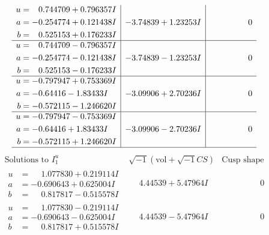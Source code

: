 \documentclass[1p]{elsarticle_modified}
\theoremstyle{definition}
\newcommand{\I}{\sqrt{-1}}
\begin{document}
$$\begin{array}{c|c|c}
\begin{aligned}
u &= \phantom{-}0.744709 + 0.796357 I \\
a &= -0.254774 + 0.121438 I \\
b &= \phantom{-}0.525153 + 0.176233 I\end{aligned}
 & -3.74839 + 1.23253 I & \phantom{-0.000000 } 0 \\ \hline\begin{aligned}
u &= \phantom{-}0.744709 - 0.796357 I \\
a &= -0.254774 - 0.121438 I \\
b &= \phantom{-}0.525153 - 0.176233 I\end{aligned}
 & -3.74839 - 1.23253 I & \phantom{-0.000000 } 0 \\ \hline\begin{aligned}
u &= -0.797947 + 0.753369 I \\
a &= -0.64416 - 1.83433 I \\
b &= -0.572115 - 1.246620 I\end{aligned}
 & -3.09906 + 2.70236 I & \phantom{-0.000000 } 0 \\ \hline\begin{aligned}
u &= -0.797947 - 0.753369 I \\
a &= -0.64416 + 1.83433 I \\
b &= -0.572115 + 1.246620 I\end{aligned}
 & -3.09906 - 2.70236 I & \phantom{-0.000000 } 0\\
 \hline 
 \end{array}$$\newpage$$\begin{array}{c|c|c}  
\text{Solutions to }I^u_{1}& \I (\text{vol} + \sqrt{-1}CS) & \text{Cusp shape}\\
 \hline 
\begin{aligned}
u &= \phantom{-}1.077830 + 0.219114 I \\
a &= -0.690643 + 0.625004 I \\
b &= \phantom{-}0.817817 - 0.515578 I\end{aligned}
 & \phantom{-}4.44539 + 5.47964 I & \phantom{-0.000000 } 0 \\ \hline\begin{aligned}
u &= \phantom{-}1.077830 - 0.219114 I \\
a &= -0.690643 - 0.625004 I \\
b &= \phantom{-}0.817817 + 0.515578 I\end{aligned}
 & \phantom{-}4.44539 - 5.47964 I & \phantom{-0.000000 } 0 \\ \hline\begin{aligned}

\end{aligned}
\end{array}$$
\end{document}
